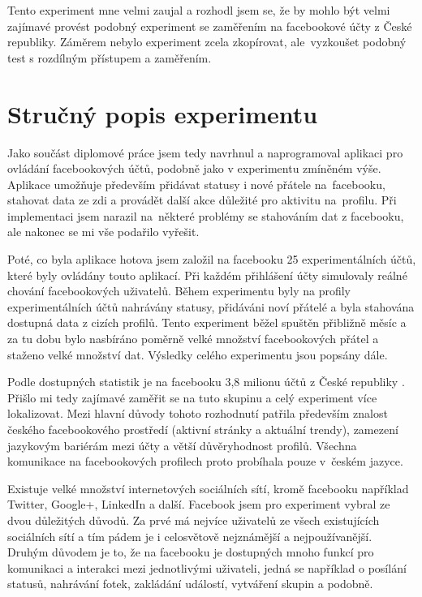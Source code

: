 \documentclass[thesis=M,czech]{FITthesis}[2013/05/10]
\begin{document}
Tento experiment mne velmi zaujal a rozhodl jsem se, že by mohlo být velmi zajímavé provést podobný experiment se zaměřením na facebookové účty z České republiky. Záměrem nebylo experiment zcela zkopírovat, ale~vyzkoušet podobný test s rozdílným přístupem a zaměřením. 

\section{Stručný popis experimentu}

Jako součást diplomové práce jsem tedy navrhnul a naprogramoval aplikaci pro ovládání facebookových účtů, podobně jako v experimentu zmíněném výše. Aplikace umožňuje především přidávat statusy i nové přátele na~facebooku, stahovat data ze zdi a provádět další akce důležité pro aktivitu na~profilu. Při implementaci jsem narazil na~některé problémy se stahováním dat z facebooku, ale nakonec se mi vše podařilo vyřešit.

Poté, co byla aplikace hotova jsem založil na facebooku 25 experimentálních účtů, které byly ovládány touto aplikací. Při každém přihlášení účty simulovaly reálné chování facebookových uživatelů. Během experimentu byly na profily experimentálních účtů nahrávány statusy, přidáváni noví přátelé a byla stahována dostupná data z cizích profilů. Tento experiment běžel spuštěn přibližně měsíc a za tu dobu bylo nasbíráno poměrně velké množství facebookových přátel a staženo velké množství dat. Výsledky celého experimentu jsou popsány dále.

Podle dostupných statistik je na facebooku 3,8 milionu účtů z České republiky \cite{web:fbCzechUsers}. Přišlo mi tedy zajímavé zaměřit se na tuto skupinu a celý experiment více lokalizovat. Mezi hlavní důvody tohoto rozhodnutí patřila především znalost českého facebookového prostředí (aktivní stránky a aktuální trendy), zamezení jazykovým bariérám mezi účty a větší důvěryhodnost profilů. Všechna komunikace na facebookových profilech proto probíhala pouze v~českém jazyce.

Existuje velké množství internetových sociálních sítí, kromě facebooku například Twitter, Google+, LinkedIn a další. Facebook jsem pro experiment vybral ze dvou důležitých důvodů. Za prvé má nejvíce uživatelů ze všech existujících sociálních sítí a tím pádem je i celosvětově nejznámější a nejpoužívanější. Druhým důvodem je to, že na facebooku je dostupných mnoho funkcí pro komunikaci a interakci mezi jednotlivými uživateli, jedná se například o posílání statusů, nahrávání fotek, zakládání událostí, vytváření skupin a podobně.
\end{document}

